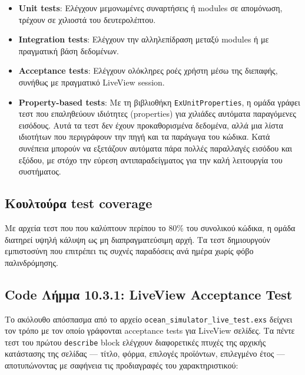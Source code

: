 \begin{itemize}
\tightlist
\item
  \textbf{Unit tests}: Ελέγχουν μεμονωμένες συναρτήσεις ή modules σε
  απομόνωση, τρέχουν σε χιλιοστά του δευτερολέπτου.
\item
  \textbf{Integration tests}: Ελέγχουν την αλληλεπίδραση μεταξύ modules
  ή με πραγματική βάση δεδομένων.
\item
  \textbf{Acceptance tests}: Ελέγχουν ολόκληρες ροές χρήστη μέσω της
  διεπαφής, συνήθως με πραγματικό LiveView session.
\item
  \textbf{Property-based tests}: Με τη βιβλιοθήκη
  \texttt{ExUnitProperties}, η ομάδα γράφει τεστ που επαληθεύουν
  ιδιότητες (properties) για χιλιάδες αυτόματα παραγόμενες εισόδους.
  Αυτά τα τεστ δεν έχουν προκαθορισμένα δεδομένα, αλλά μια λίστα
  ιδιοτήτων που περιγράφουν την πηγή και τα παράγωγα του κώδικα. Κατά
  συνέπεια μπορούν να εξετάζουν αυτόματα πάρα πολλές παραλλαγές εισόδου
  και εξόδου, με στόχο την εύρεση αντιπαραδείγματος για την καλή
  λειτουργία του συστήματος.
\end{itemize}

\subsection{Κουλτούρα test
coverage}\label{ux3baux3bfux3c5ux3bbux3c4ux3bfux3cdux3c1ux3b1-test-coverage}

Με αρχεία τεστ που που καλύπτουν περίπου το 80\% του συνολικού κώδικα, η
ομάδα διατηρεί υψηλή κάλυψη ως μη διαπραγματεύσιμη αρχή. Τα τεστ
δημιουργούν εμπιστοσύνη που επιτρέπει τις συχνές παραδόσεις ανά ημέρα
χωρίς φόβο παλινδρόμησης.

\subsection{Code Λήμμα 10.3.1: LiveView Acceptance
Test}\label{code-ux3bbux3aeux3bcux3bcux3b1-10.3.1-liveview-acceptance-test}

Το ακόλουθο απόσπασμα από το αρχείο
\texttt{ocean\_simulator\_live\_test.exs} δείχνει τον τρόπο με τον οποίο
γράφονται acceptance tests για LiveView σελίδες. Τα πέντε τεστ του
πρώτου \texttt{describe} block ελέγχουν διαφορετικές πτυχές της αρχικής
κατάστασης της σελίδας --- τίτλο, φόρμα, επιλογές προϊόντων, επιλεγμένο
έτος --- αποτυπώνοντας με σαφήνεια τις προδιαγραφές του χαρακτηριστικού:

